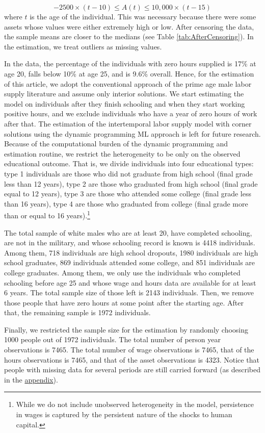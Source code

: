 \documentclass{article}
\begin{document}
 $$ -2500 \times (t-10) \leq A(t) \leq 10,000 \times (t-15)$$
 where $t$ is the age of the individual. This was necessary because there were some assets whose values were either extremely high or low. After censoring the data, the sample means are closer to the medians (see Table \ref{tab:AfterCensoring}). In the estimation, we treat outliers as missing values. \par
 
 In the data, the percentage of the individuals with zero hours supplied is 17\% at age 20, falls below 10\% at age 25, and is 9.6\% overall. Hence, for the estimation of this article, we adopt the conventional approach of the prime age male labor supply literature and assume only interior solutions. We start estimating the model on individuals after they finish schooling and when they start working positive hours, and we exclude individuals who have a year of zero hours of work after that. The estimation of the intertemporal labor supply model with corner solutions using the dynamic programming ML approach is left for future research. Because of the computational burden of the dynamic programming and estimation routine, we restrict the heterogeneity to be only on the observed educational outcome. That is, we divide individuals into four educational types: type 1 individuals are those who did not graduate from high school (final grade less than 12 years), type 2 are those who graduated from high school (final grade equal to 12 years), type 3 are those who attended some college (final grade less than 16 years), type 4 are those who graduated from college (final grade more than or equal to 16 years).\footnote[10]{While we do not include unobserved heterogeneity in the model, persistence in wages is captured by the persistent nature of the shocks to human capital.} \par

 The total sample of white males who are at least 20, have completed schooling, are not in the military, and whose schooling record is known is 4418 individuals. Among them, 718 individuals are high school dropouts, 1980 individuals are high school graduates, 869 individuals attended some college, and 851 individuals are college graduates. Among them, we only use the individuals who completed schooling before age 25 and whose wage and hours data are available for at least 6 years. The total sample size of those left is 2143 individuals. Then, we remove those people that have zero hours at some point after the starting age. After that, the remaining sample is 1972 individuals. \par
Finally, we restricted the sample size for the estimation by randomly choosing 1000 people out of 1972 individuals. The total number of person year observations is 7465. The total number of wage observations is 7465, that of the hours observations is 7465, and that of the asset observations is 4323. Notice that people with missing data for several periods are still carried forward (as described in the \hyperref[appendix]{appendix}).
\end{document}
